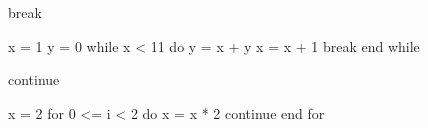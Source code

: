 break

x = 1
y = 0
while x < 11 do
  y = x + y
  x = x + 1
  break
end while

continue

x = 2
for 0 <= i < 2 do
  x = x * 2
  continue
end for

